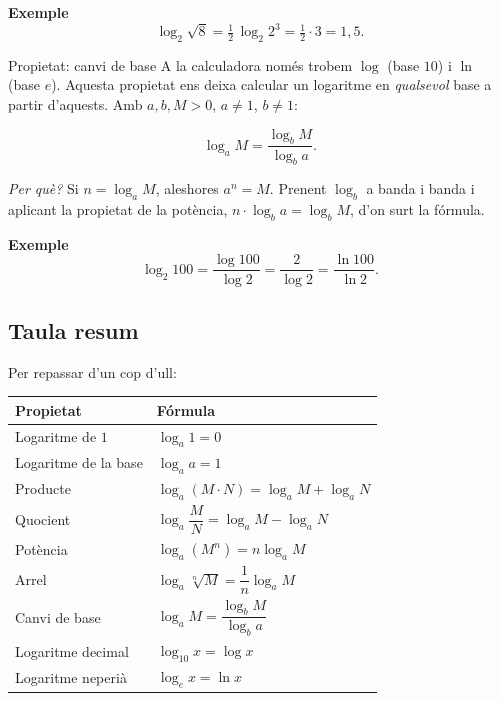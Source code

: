 \begin{exemple}{\textbf{Exemple}}
\[
\log_2 \sqrt{8}
= \tfrac{1}{2}\,\log_2 2^3
= \tfrac{1}{2}\cdot 3
= 1{,}5.
\]
\end{exemple}

\begin{propietat}{Propietat: canvi de base}
A la calculadora només trobem $\log$ (base $10$) i $\ln$ (base $e$). Aquesta propietat ens deixa calcular un logaritme en \emph{qualsevol} base a partir d'aquests. Amb $a,b,M>0$, $a\neq 1$, $b\neq 1$:

\[
\log_a M = \frac{\log_b M}{\log_b a}.
\]

\emph{Per què?} Si $n=\log_a M$, aleshores $a^n=M$. Prenent $\log_b$ a banda i banda i aplicant la propietat de la potència, $n\cdot\log_b a=\log_b M$, d'on surt la fórmula.
\end{propietat}

\begin{exemple}{\textbf{Exemple}}
\[
\log_2 100 = \frac{\log 100}{\log 2} = \frac{2}{\log 2} = \frac{\ln 100}{\ln 2}.
\]
\end{exemple}

\subsection{Taula resum}

Per repassar d'un cop d'ull:

\begin{center}
\begin{tabular}{ll}
\toprule
\textbf{Propietat} & \textbf{Fórmula} \\
\midrule
Logaritme de $1$ & $\log_a 1 = 0$ \\
Logaritme de la base & $\log_a a = 1$ \\
Producte & $\log_a (M\cdot N) = \log_a M + \log_a N$ \\
Quocient & $\log_a \dfrac{M}{N} = \log_a M - \log_a N$ \\
Potència & $\log_a (M^n) = n\log_a M$ \\
Arrel & $\log_a \sqrt[n]{M} = \dfrac{1}{n}\log_a M$ \\
Canvi de base & $\log_a M = \dfrac{\log_b M}{\log_b a}$ \\
Logaritme decimal & $\log_{10} x = \log x$ \\
Logaritme neperià & $\log_e x = \ln x$ \\
\bottomrule
\end{tabular}
\end{center}

